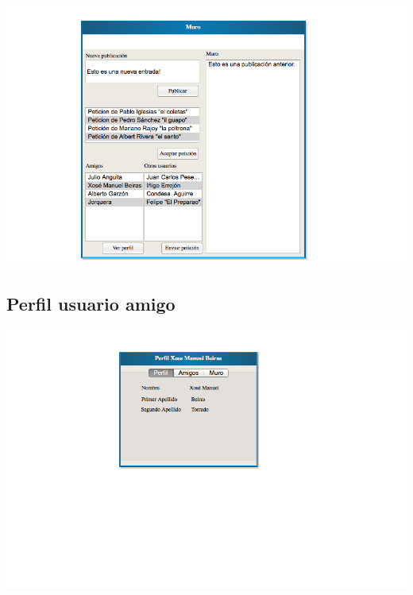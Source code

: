 \documentclass[12pt, a4paper, titlepage]{article}
\begin{document}
\begin{center}
	\includegraphics[scale=0.7]{Imagenes/muro}
\end{center}

\subsection{Perfil usuario amigo}

\begin{center}
	\includegraphics[scale=0.7]{Imagenes/perfil_amigo}
\end{center}
\end{document}
